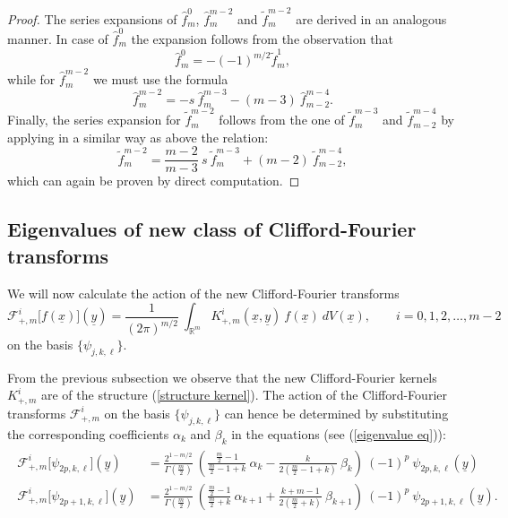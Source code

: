 \documentclass{amsart}
\theoremstyle{remark}
\begin{document}
\begin{proof}
The series expansions of $\hat{f}_m^0$, $\hat{f}_m^{m-2}$ and $\tilde{f}_m^{m-2}$ are derived in an analogous manner.
In case of $\hat{f}_m^0$ the expansion follows from the observation that
\begin{displaymath}
\hat{f}_m^0 = - (-1)^{m/2} \tilde{f}_m^1,
\end{displaymath}
while for $\hat{f}_m^{m-2}$ we must use the formula
\begin{displaymath}
\hat{f}_m^{m-2} = -s \ \hat{f}_m^{m-3} - (m-3) \ \hat{f}_{m-2}^{m-4}  .
\end{displaymath}
Finally, the series expansion for $\tilde{f}_m^{m-2}$ follows from the one of $\tilde{f}_m^{m-3}$ and $\tilde{f}_{m-2}^{m-4}$ by applying in a similar way as above the relation:
\begin{displaymath}
\tilde{f}_m^{m-2} = \frac{m-2}{m-3} \ s \ \tilde{f}_m^{m-3} + (m-2) \ \tilde{f}_{m-2}^{m-4}, 
\end{displaymath} 
which can again be proven by direct computation.
\end{proof}
\subsection{Eigenvalues of new class of Clifford-Fourier transforms}
\label{eigvalseven}

We will now calculate the action of the new Clifford-Fourier transforms
\begin{displaymath}
\mathcal{F}^{i}_{+,m} \lbrack f({\underline{x}}) \rbrack ({\underline{y}}) = \frac{1}{(2\pi)^{m/2}} \ \int_{\mathbb{R}^m} K^{i}_{+,m}({\underline{x}},{\underline{y}}) \ f({\underline{x}}) \ dV({\underline{x}}), \qquad i=0,1,2,\ldots,m-2
\end{displaymath}
on the basis $\lbrace \psi_{j,k,\ell} \rbrace$. 

From the previous subsection we observe that the new Clifford-Fourier kernels $K_{+,m}^{i}$ are of the structure (\ref{structure kernel}). The action of the Clifford-Fourier transforms $\mathcal{F}^{i}_{+,m}$ on the basis $\lbrace \psi_{j,k,\ell} \rbrace$ can hence be determined by substituting the corresponding coefficients $\alpha_k$ and $\beta_k$ in the equations (see (\ref{eigenvalue eq})):
\begin{align}\label{eigenvalue eq scaling}
\begin{split}
\mathcal{F}^{i}_{+,m} \lbrack \psi_{2p,k,\ell} \rbrack ({\underline{y}}) &=  \frac{2^{1-m/2}}{\Gamma \left( \frac{m}{2} \right)} \ \left( \frac{\frac{m}{2}-1}{\frac{m}{2}-1+k} \ \alpha_k - \frac{k}{2(\frac{m}{2}-1+k)} \ \beta_k \right) \ (-1)^p \ \psi_{2p,k,\ell}({\underline{y}})\\
\mathcal{F}^{i}_{+,m} \lbrack \psi_{2p+1,k,\ell} \rbrack ({\underline{y}}) &=  \frac{2^{1-m/2}}{\Gamma \left( \frac{m}{2} \right)} \ \left( \frac{\frac{m}{2}-1}{\frac{m}{2}+k} \ \alpha_{k+1} + \frac{k+m-1}{2(\frac{m}{2}+k)} \ \beta_{k+1} \right) \ (-1)^p \ \psi_{2p+1,k,\ell}({\underline{y}}) . 
\end{split}
\end{align}
\end{document}
